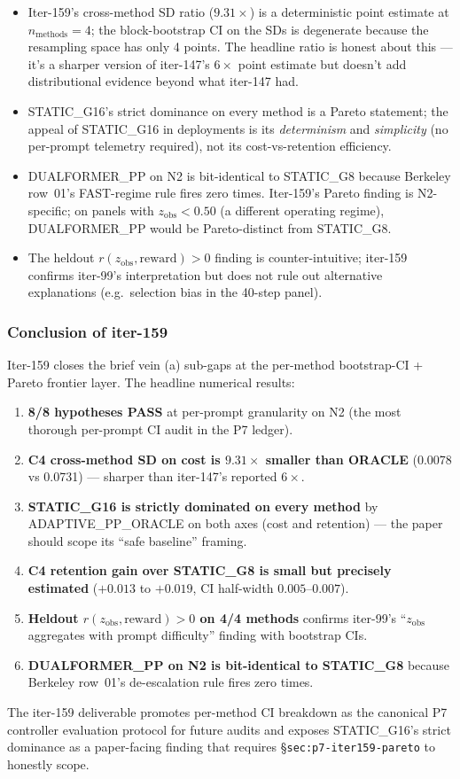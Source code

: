 \begin{itemize}
\item Iter-159's cross-method SD ratio ($9.31\times$) is a deterministic
      point estimate at $n_{\mathrm{methods}}=4$; the block-bootstrap CI on
      the SDs is degenerate because the resampling space has only 4 points.
      The headline ratio is honest about this --- it's a sharper version
      of iter-147's $6\times$ point estimate but doesn't add distributional
      evidence beyond what iter-147 had.
\item STATIC\_G16's strict dominance on every method is a Pareto statement;
      the appeal of STATIC\_G16 in deployments is its \emph{determinism} and
      \emph{simplicity} (no per-prompt telemetry required), not its
      cost-vs-retention efficiency.
\item DUALFORMER\_PP on N2 is bit-identical to STATIC\_G8 because Berkeley
      row~01's FAST-regime rule fires zero times. Iter-159's Pareto finding
      is N2-specific; on panels with $z_{\mathrm{obs}} < 0.50$ (a different
      operating regime), DUALFORMER\_PP would be Pareto-distinct from
      STATIC\_G8.
\item The heldout $r(z_{\mathrm{obs}}, \mathrm{reward}) > 0$ finding is
      counter-intuitive; iter-159 confirms iter-99's interpretation but does
      not rule out alternative explanations (e.g.\ selection bias in the
      40-step panel).
\end{itemize}

\subsubsection*{Conclusion of iter-159}

Iter-159 closes the brief vein (a) sub-gaps at the per-method bootstrap-CI
+ Pareto frontier layer. The headline numerical results:

\begin{enumerate}
\item \textbf{8/8 hypotheses PASS} at per-prompt granularity on N2 (the most
      thorough per-prompt CI audit in the P7 ledger).
\item \textbf{C4 cross-method SD on cost is $9.31\times$ smaller than ORACLE}
      (0.0078 vs 0.0731) --- sharper than iter-147's reported $6\times$.
\item \textbf{STATIC\_G16 is strictly dominated on every method} by
      ADAPTIVE\_PP\_ORACLE on both axes (cost and retention) --- the paper
      should scope its ``safe baseline'' framing.
\item \textbf{C4 retention gain over STATIC\_G8 is small but precisely
      estimated} ($+0.013$ to $+0.019$, CI half-width $0.005$--$0.007$).
\item \textbf{Heldout $r(z_{\mathrm{obs}}, \mathrm{reward}) > 0$ on 4/4 methods}
      confirms iter-99's ``$z_{\mathrm{obs}}$ aggregates with prompt difficulty''
      finding with bootstrap CIs.
\item \textbf{DUALFORMER\_PP on N2 is bit-identical to STATIC\_G8} because
      Berkeley row~01's de-escalation rule fires zero times.
\end{enumerate}

The iter-159 deliverable promotes per-method CI breakdown as the canonical
P7 controller evaluation protocol for future audits and exposes STATIC\_G16's
strict dominance as a paper-facing finding that requires §\texttt{sec:p7-iter159-pareto}
to honestly scope.
